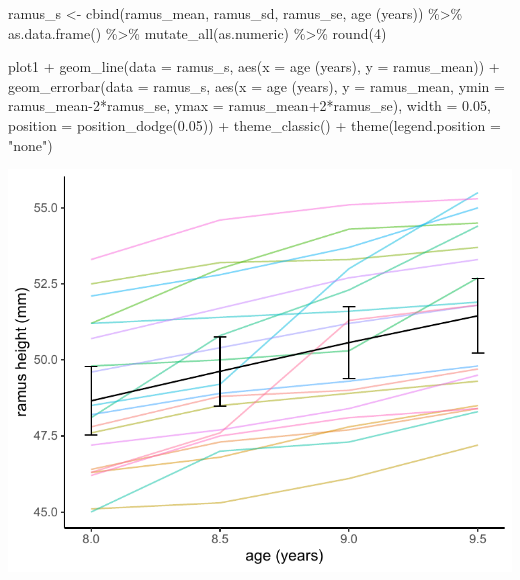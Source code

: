 \documentclass[
  9pt,
  ignorenonframetext,
]{beamer}
\newenvironment{Shaded}{\begin{snugshade}}{\end{snugshade}}
\newcommand{\AttributeTok}[1]{\textcolor[rgb]{0.77,0.63,0.00}{#1}}
\newcommand{\DecValTok}[1]{\textcolor[rgb]{0.00,0.00,0.81}{#1}}
\newcommand{\FloatTok}[1]{\textcolor[rgb]{0.00,0.00,0.81}{#1}}
\newcommand{\FunctionTok}[1]{\textcolor[rgb]{0.00,0.00,0.00}{#1}}
\newcommand{\NormalTok}[1]{#1}
\newcommand{\OtherTok}[1]{\textcolor[rgb]{0.56,0.35,0.01}{#1}}
\newcommand{\SpecialCharTok}[1]{\textcolor[rgb]{0.00,0.00,0.00}{#1}}
\newcommand{\StringTok}[1]{\textcolor[rgb]{0.31,0.60,0.02}{#1}}
\begin{document}
\begin{frame}[fragile]{}
\protect\hypertarget{section-3}{}
\tiny

\begin{Shaded}
\begin{Highlighting}[]
\NormalTok{ramus\_s }\OtherTok{\textless{}{-}} \FunctionTok{cbind}\NormalTok{(ramus\_mean, ramus\_sd, }
\NormalTok{                 ramus\_se, }\StringTok{\textasciigrave{}}\AttributeTok{age (years)}\StringTok{\textasciigrave{}}\NormalTok{) }\SpecialCharTok{\%\textgreater{}\%}
  \FunctionTok{as.data.frame}\NormalTok{() }\SpecialCharTok{\%\textgreater{}\%}
  \FunctionTok{mutate\_all}\NormalTok{(as.numeric) }\SpecialCharTok{\%\textgreater{}\%}
  \FunctionTok{round}\NormalTok{(}\DecValTok{4}\NormalTok{) }

\NormalTok{plot1 }\SpecialCharTok{+} \FunctionTok{geom\_line}\NormalTok{(}\AttributeTok{data =}\NormalTok{ ramus\_s, }
                  \FunctionTok{aes}\NormalTok{(}\AttributeTok{x =} \StringTok{\textasciigrave{}}\AttributeTok{age (years)}\StringTok{\textasciigrave{}}\NormalTok{, }
                      \AttributeTok{y =}\NormalTok{ ramus\_mean)) }\SpecialCharTok{+}
  \FunctionTok{geom\_errorbar}\NormalTok{(}\AttributeTok{data =}\NormalTok{ ramus\_s,}
                \FunctionTok{aes}\NormalTok{(}\AttributeTok{x =} \StringTok{\textasciigrave{}}\AttributeTok{age (years)}\StringTok{\textasciigrave{}}\NormalTok{, }\AttributeTok{y =}\NormalTok{ ramus\_mean,}
                    \AttributeTok{ymin =}\NormalTok{ ramus\_mean}\DecValTok{{-}2}\SpecialCharTok{*}\NormalTok{ramus\_se,}
                    \AttributeTok{ymax =}\NormalTok{ ramus\_mean}\SpecialCharTok{+}\DecValTok{2}\SpecialCharTok{*}\NormalTok{ramus\_se),}
                \AttributeTok{width =} \FloatTok{0.05}\NormalTok{,  }\AttributeTok{position =} \FunctionTok{position\_dodge}\NormalTok{(}\FloatTok{0.05}\NormalTok{)) }\SpecialCharTok{+}
  \FunctionTok{theme\_classic}\NormalTok{() }\SpecialCharTok{+}
  \FunctionTok{theme}\NormalTok{(}\AttributeTok{legend.position =} \StringTok{"none"}\NormalTok{) }
\end{Highlighting}
\end{Shaded}

\begin{center}\includegraphics[width=0.6\linewidth]{figs_L2/unnamed-chunk-6-1} \end{center}

\tiny
\end{frame}
\end{document}
